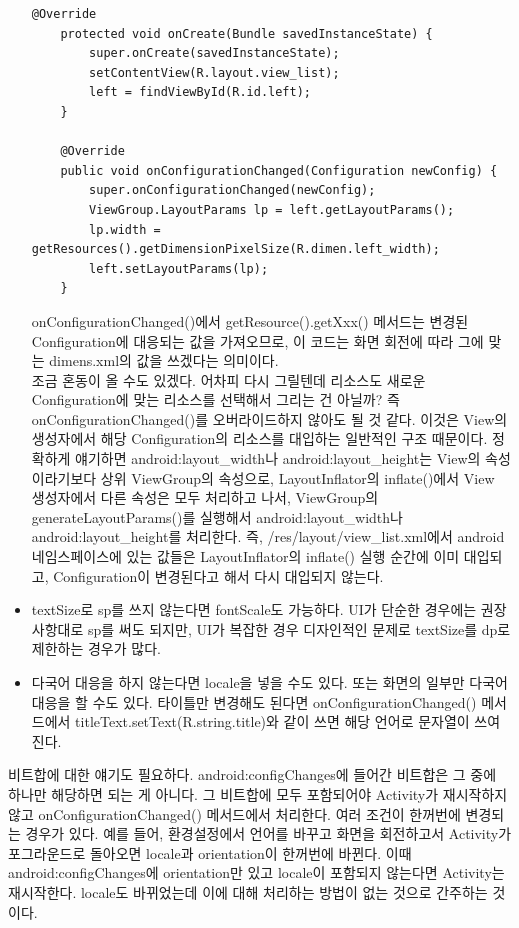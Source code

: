 \begin{itemize}
\begin{lstlisting}[frame=single]
	@Override
	protected void onCreate(Bundle savedInstanceState) {
		super.onCreate(savedInstanceState);
		setContentView(R.layout.view_list);
		left = findViewById(R.id.left);
	}

	@Override
	public void onConfigurationChanged(Configuration newConfig) {
		super.onConfigurationChanged(newConfig);
		ViewGroup.LayoutParams lp = left.getLayoutParams();
		lp.width = getResources().getDimensionPixelSize(R.dimen.left_width);
		left.setLayoutParams(lp);
	}
\end{lstlisting}
onConfigurationChanged()에서 getResource().getXxx() 메서드는 변경된 Configuration에 대응되는 값을 가져오므로, 이 코드는 화면 회전에 따라 그에 맞는 dimens.xml의 값을 쓰겠다는 의미이다.\\

조금 혼동이 올 수도 있겠다. 어차피 다시 그릴텐데 리소스도 새로운 Configuration에 맞는 리소스를 선택해서 그리는 건 아닐까? 
즉 onConfigurationChanged()를 오버라이드하지 않아도 될 것 같다.
이것은 View의 생성자에서 해당 Configuration의 리소스를 대입하는 일반적인 구조 때문이다. 정확하게 얘기하면 android:layout\_width나 android:layout\_height는 View의 속성이라기보다 상위 ViewGroup의 속성으로, LayoutInflator의 inflate()에서 View 생성자에서 다른 속성은 모두 처리하고 나서, ViewGroup의 generateLayoutParams()를 실행해서 android:layout\_width나 android:layout\_height를 처리한다.
즉, /res/layout/view\_list.xml에서 android 네임스페이스에 있는 값들은 LayoutInflator의 inflate() 실행 순간에 이미 대입되고, Configuration이 변경된다고 해서 다시 대입되지 않는다. 
	
\item textSize로 sp를 쓰지 않는다면 fontScale도 가능하다. UI가 단순한 경우에는 권장사항대로 sp를 써도 되지만, UI가 복잡한 경우 디자인적인 문제로 textSize를 dp로 제한하는 경우가 많다.

\item 다국어 대응을 하지 않는다면 locale을 넣을 수도 있다. 또는 화면의 일부만 다국어 대응을 할 수도 있다. 타이틀만 변경해도 된다면 onConfigurationChanged() 메서드에서 titleText.setText(R.string.title)와 같이 쓰면 해당 언어로 문자열이 쓰여진다.
\end{itemize}

비트합에 대한 얘기도 필요하다. android:configChanges에 들어간 비트합은 그 중에 하나만 해당하면 되는 게 아니다. 그 비트합에 모두 포함되어야 Activity가 재시작하지 않고 onConfigurationChanged() 메서드에서 처리한다. 여러 조건이 한꺼번에 변경되는 경우가 있다. 예를 들어, 환경설정에서 언어를 바꾸고 화면을 회전하고서 Activity가 포그라운드로 돌아오면 locale과 orientation이 한꺼번에 바뀐다. 이때 android:configChanges에 orientation만 있고 locale이 포함되지 않는다면 Activity는 재시작한다. locale도 바뀌었는데 이에 대해 처리하는 방법이 없는 것으로 간주하는 것이다.\\

